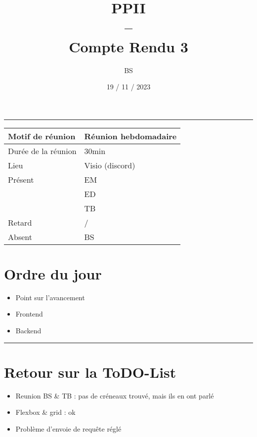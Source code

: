 \documentclass[10pt,a4paper]{report}
\title{PPII \\ -- \\ Compte Rendu 3}
\date{19 / 11 / 2023}
\author{BS}
\begin{document}
\maketitle

\tableofcontents \bigskip

\noindent\rule{\linewidth}{0.5mm} \bigskip

                \begin{tabular}{|l | l|}
                        \hline
                Motif de réunion & Réunion hebdomadaire \\
                        \hline
                Durée de la réunion & 30min \\
                        \hline
                Lieu & Visio (discord) \\
                        \hline
                Présent & EM \\
                        & ED \\
                        & TB  \\
                        \hline
                Retard  & / \\
                        \hline
                Absent  & BS \\
                        \hline
                \end{tabular}


\section{Ordre du jour}
\begin{itemize}
        \item Point sur l’avancement
        \item Frontend
        \item Backend
\end{itemize}

\noindent\rule{\linewidth}{0.5mm} \bigskip
\section{Retour sur la ToDO-List}
\begin{itemize}
        \item Reunion BS \& TB : pas de créneaux trouvé, mais ils en ont parlé
        \item Flexbox \& grid : ok
        \item Problème d’envoie de requête réglé        
\end{itemize}
\end{document}
